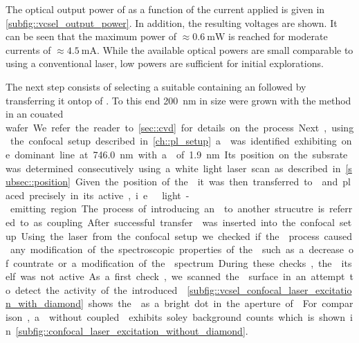 	The optical output power of \BmFour as a function of the current applied is given in \autoref{subfig::vcsel_output_power}. In addition, the resulting voltages are shown. It can be seen that the maximum power of $\approx \SI{0.6}{\mW}$ is reached for moderate currents of $\approx \SI{4.5}{\mA}$. While the available optical powers are small comparable to using a conventional laser, low powers are sufficient for initial explorations.

	The next step consists of selecting a suitable \nd containing an \siv followed by transferring it ontop of \BmFour. To this end \nds \SI{200}{\nm} in size were grown with the \CVD method in an \ir couated \si wafer. We refer the reader to \autoref{sec::cvd} for details on the process.

	Next, using the confocal setup described in \autoref{ch::pl_setup} a \nd was identified exhibiting one dominant line at \SI{746.0}{nm} with a \lw of \SI{1.9}{nm}. Its position on the subsrate was determined consecutively using a white light laser scan as described in \autoref{subsec::position}. Given the position of the \nd it was then transferred to \BmFour and placed precisely in its active, i.e.\ light-emitting region. The process of introducing an \siv to another strucutre is referred to as coupling.

	After successful transfer \BmFour was inserted into the confocal setup.
	Using the laser from the confocal setup we checked if the \pp process caused any modification of the spectroscopic properties of the \siv such as a decrease of countrate or a modification of the \fl spectrum. During these checks, the \VCSEL itself was not active.

	As a first check, we scanned the \VCSEL surface in an attempt to detect the activity of the introduced \siv. \autoref{subfig::vcsel_confocal_laser_excitation_with_diamond} shows the \siv as a bright dot in the aperture of \BmFour. For comparison, a \Vcsel without coupled \siv exhibits soley background counts which is shown in \autoref{subfig::confocal_laser_excitation_without_diamond}.


